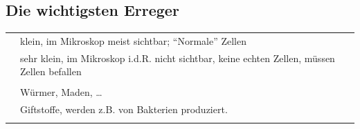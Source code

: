 




\subsection{Die wichtigsten Erreger}
\label{topic:infektion-erreger}

\begin{table}[H]

\begin{tabulary}{\linewidth}{LL}
&
\\\midrule\addlinespace
{}
&
klein, im Mikroskop meist sichtbar;
        {\textquotedblleft}Normale{\textquotedblright} Zellen
\\\addlinespace
{}
&
sehr klein, im Mikroskop i.d.R. nicht
        sichtbar, keine echten Zellen, müssen Zellen befallen
\\\addlinespace
{}
&

\\\addlinespace
{}
&
Würmer, Maden, \ldots
\\\addlinespace
{}
&
Giftstoffe, werden z.B. von Bakterien produziert.
\\\addlinespace\bottomrule
\end{tabulary}
\end{table}

% 
% 
% 
% 
% 
% 
% 

